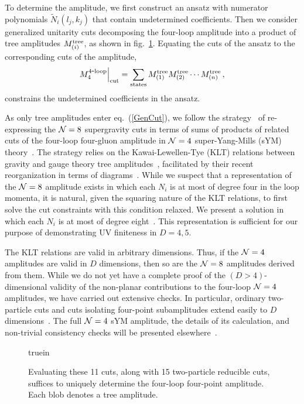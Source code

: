 \documentclass[aps,prl,twocolumn,groupedaddress,draft,showpacs,nofootinbib]{revtex4}
\def\fig#1{fig.~{\ref{#1}}}
\def\tree{{\rm tree}}
\def\eqn#1{eq.~(\ref{#1})}
\def\NeqFour{{{\cal N}=4}}
\def\NeqEight{{{\cal N}=8}}
\def\tree{{\rm tree}}
\def\fourloop{{\rm 4\hbox{-}loop}}
\begin{document}
To determine the amplitude, we first construct an ansatz with
numerator polynomials $\widetilde N_i(l_j, k_j)$ that contain undetermined
coefficients.  Then we consider generalized unitarity cuts
decomposing the four-loop amplitude into a product of tree
amplitudes $M^\tree_{(i)}$, as shown in \fig{CutBasisFigure}.
Equating the cuts of the ansatz to
the corresponding cuts of the amplitude,
%
\begin{equation}
M_4^{\fourloop} \Bigr|_{\rm cut}
= \sum_{\rm states} M^\tree_{(1)} M^\tree_{(2)} \cdots  M^\tree_{(n)} \,,
\label{GenCut}
\end{equation}
%
constrains the undetermined coefficients in the ansatz.

As only tree amplitudes enter \eqn{GenCut}, we follow the 
strategy~\cite{BDDPR} of re-expressing the $\NeqEight$ supergravity cuts in
terms of sums of products of related cuts of the four-loop four-gluon
amplitude in $\NeqFour$ super-Yang-Mills (sYM)
theory~\cite{FourLoopPlanarYM, FourLoopYM}.  The strategy relies on
the Kawai-Lewellen-Tye (KLT) relations between gravity and gauge
theory tree amplitudes~\cite{KLT}, facilitated by their recent
reorganization in terms of diagrams~\cite{TreeJacobi}.  While we
suspect that a representation of the $\NeqEight$ amplitude exists in
which each $N_i$ is at most of degree four in the loop momenta, it is
natural, given the squaring nature of the KLT relations, to first
solve the cut constraints with this condition relaxed.  We
present a solution in which each $N_i$ is at most of degree
eight~\cite{WebResult}.  This representation is sufficient for our
purpose of demonstrating UV finiteness in $D=4,5$.

The KLT relations are valid in arbitrary
dimensions.  Thus, if the $\NeqFour$ amplitudes are valid in $D$
dimensions, then so are the $\NeqEight$ amplitudes derived from them.
While we do not yet have a complete proof of the $(D>4)$-dimensional
validity of the non-planar contributions to the four-loop $\NeqFour$
amplitudes, we have carried out extensive checks.  In particular, 
ordinary two-particle cuts and cuts isolating four-point subamplitudes
extend easily to $D$ dimensions~\cite{FourLoopPlanarYM,
FourLoopYM, TreeJacobi}.  The full $\NeqFour$ sYM
amplitude, the details of its calculation, and non-trivial
consistency checks will be presented elsewhere~\cite{FourLoopYM}.

\begin{figure}[t]
\centerline{ truein }
\caption[a]{\small Evaluating these 11 cuts, along with 15
two-particle reducible cuts, suffices to uniquely
determine the four-loop four-point amplitude. Each blob
denotes a tree amplitude. }
\label{CutBasisFigure}
\end{figure}
\end{document}
